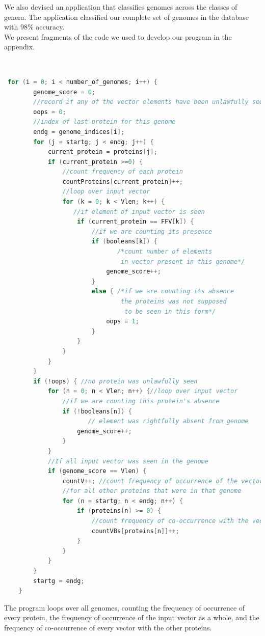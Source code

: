 \documentclass{ucetd}
\begin{document}
We also devised an application that  classifies genomes across the classes of genera. The application classified our complete set of genomes in the database with 98\% accuracy. \\
We present fragments of the code we used to develop our program in the appendix. 
\newpage

\begin{appendices}
\chapter{}

\begin{lstlisting}[language=C]

 for (i = 0; i < number_of_genomes; i++) {
        genome_score = 0;
        //record if any of the vector elements have been unlawfully seen
        oops = 0; 
        //index of last protein for this genome
        endg = genome_indices[i]; 
        for (j = startg; j < endg; j++) {
            current_protein = proteins[j];
            if (current_protein >=0) {
            	//count frequency of each protein
                countProteins[current_protein]++; 
                //loop over input vector
                for (k = 0; k < Vlen; k++) { 
               	   //if element of input vector is seen
                    if (current_protein == FFV[k]) { 
                    	//if we are counting its presence
                        if (booleans[k]) { 
                        	   /*count number of elements
	   		    				in vector present in this genome*/
                            genome_score++; 
                        }
                        else { /*if we are counting its absence 
                        	   	the proteins was not supposed
								 to be seen in this form*/
                            oops = 1; 
                        }
                    }
                }
            }
        }
        if (!oops) { //no protein was unlawfully seen
            for (n = 0; n < Vlen; n++) {//loop over input vector
            	//if we are counting this protein's absence
                if (!booleans[n]) { 
                	   // element was rightfully absent from genome
                    genome_score++; 
                }
            }
            //If all input vector was seen in the genome
            if (genome_score == Vlen) { 
                countV++; //count frequency of occurrence of the vector
                //for all other proteins that were in that genome
                for (n = startg; n < endg; n++) { 
                    if (proteins[n] >= 0) {
                        //count frequency of co-occurrence with the vector
                        countVBs[proteins[n]]++; 
                    }
                }
            }
        }
        startg = endg;
    }
\end{lstlisting}
The program loops over all genomes, counting the frequency of occurrence of every protein, the frequency of occurrence of the input vector as a whole, and the frequency of co-occurrence of every vector with the other proteins. 
\newpage


\end{appendices}
\end{document}
